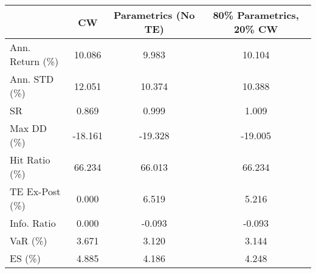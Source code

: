\begin{tabular}{lccc}
\toprule
{} &      CW &  Parametrics (No TE) &  80\% Parametrics, 20\% CW \\
\midrule
Ann. Return (\%) &  10.086 &                9.983 &                   10.104 \\
Ann. STD (\%)    &  12.051 &               10.374 &                   10.388 \\
SR              &   0.869 &                0.999 &                    1.009 \\
Max DD (\%)      & -18.161 &              -19.328 &                  -19.005 \\
Hit Ratio (\%)   &  66.234 &               66.013 &                   66.234 \\
TE Ex-Post (\%)  &   0.000 &                6.519 &                    5.216 \\
Info. Ratio     &   0.000 &               -0.093 &                   -0.093 \\
VaR (\%)         &   3.671 &                3.120 &                    3.144 \\
ES (\%)          &   4.885 &                4.186 &                    4.248 \\
\bottomrule
\end{tabular}
